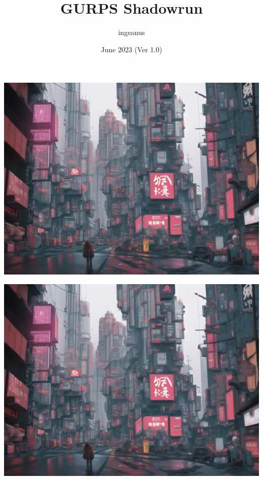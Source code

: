 \documentclass{article}
\title{GURPS Shadowrun}
\author{ingeanus}
\date{June 2023 (Ver 1.0)}
\begin{document}
	
	\maketitle
	
	\tableofcontents
	
	\newpage
	\includegraphics*[viewport = 0 0 512 768]{cover_image.png}
	
	\includegraphics*[viewport = 512 0 1024 768]{cover_image.png}
	
	
	
	\newpage
	
	
	\newpage
	
	
\end{document}
